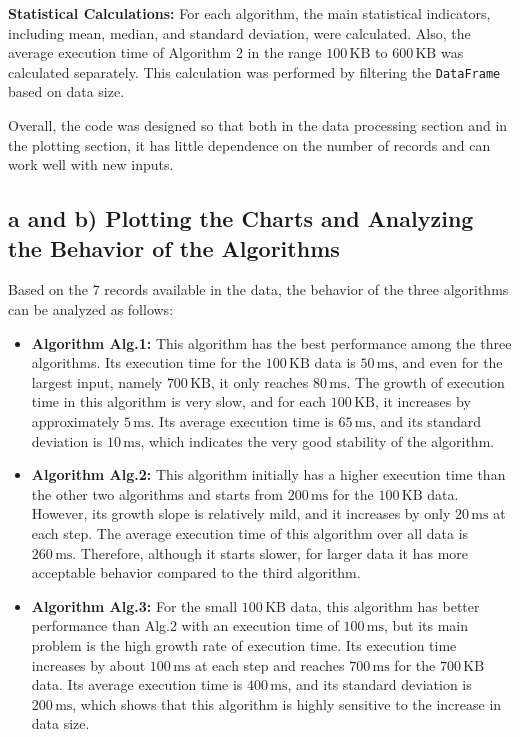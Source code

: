 \documentclass[12pt,a4paper]{article}
\begin{document}
	\textbf{Statistical Calculations:}
	For each algorithm, the main statistical indicators, including mean, median, and standard deviation, were calculated. Also, the average execution time of Algorithm 2 in the range
	$100\,\text{KB}$
	to
	$600\,\text{KB}$
	was calculated separately. This calculation was performed by filtering the
	\texttt{DataFrame}
	based on data size.
	
	Overall, the code was designed so that both in the data processing section and in the plotting section, it has little dependence on the number of records and can work well with new inputs.
	
	\subsection*{a and b) Plotting the Charts and Analyzing the Behavior of the Algorithms}
	
	Based on the 7 records available in the data, the behavior of the three algorithms can be analyzed as follows:
	
	\begin{itemize}
		\item \textbf{Algorithm Alg.1:}
		This algorithm has the best performance among the three algorithms. Its execution time for the
		$100\,\text{KB}$
		data is
		$50\,\text{ms}$,
		and even for the largest input, namely
		$700\,\text{KB}$,
		it only reaches
		$80\,\text{ms}$.
		The growth of execution time in this algorithm is very slow, and for each
		$100\,\text{KB}$,
		it increases by approximately
		$5\,\text{ms}$.
		Its average execution time is
		$65\,\text{ms}$,
		and its standard deviation is
		$10\,\text{ms}$,
		which indicates the very good stability of the algorithm.
		
		\item \textbf{Algorithm Alg.2:}
		This algorithm initially has a higher execution time than the other two algorithms and starts from
		$200\,\text{ms}$
		for the
		$100\,\text{KB}$
		data. However, its growth slope is relatively mild, and it increases by only
		$20\,\text{ms}$
		at each step. The average execution time of this algorithm over all data is
		$260\,\text{ms}$.
		Therefore, although it starts slower, for larger data it has more acceptable behavior compared to the third algorithm.
		
		\item \textbf{Algorithm Alg.3:}
		For the small
		$100\,\text{KB}$
		data, this algorithm has better performance than
		Alg.2
		with an execution time of
		$100\,\text{ms}$,
		but its main problem is the high growth rate of execution time. Its execution time increases by about
		$100\,\text{ms}$
		at each step and reaches
		$700\,\text{ms}$
		for the
		$700\,\text{KB}$
		data. Its average execution time is
		$400\,\text{ms}$,
		and its standard deviation is
		$200\,\text{ms}$,
		which shows that this algorithm is highly sensitive to the increase in data size.
	\end{itemize}
	
\end{document}
